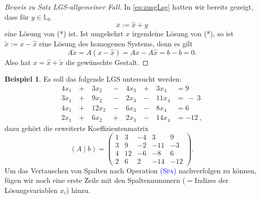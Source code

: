 \documentclass[a4paper,11pt,oneside]{article}
\theoremstyle{definition}
\newtheorem{example}{Beispiel}
\def\OP#1{\textcolor{blue}{(\textnormal{\textrm{\textsc{#1}})}}}
\begin{document}
\begin{proof}[Beweis zu Satz LGS-allgemeiner Fall]
In \eqref{eq:zusgLsg} hatten wir bereits gezeigt, dass für $y\in{\mathbb L}_0$
$$
\bar{x}:={\hat x}+y
$$
eine Lösung von (*) ist. Ist umgekehrt $x$ irgendeine Lösung von (*), so ist ${\tilde x}:=x-{\hat x}$ eine Lösung des homogenen Systems, denn es gilt
$$
A{\tilde x}=A(x-{\hat x})=Ax-A{\hat x}=b-b=0.
$$
Also hat $x ={\hat x}+{\tilde x}$ die gewünschte Gestalt.
\end{proof}


\begin{example}\label{Bsp:Kowalski}
Es soll das folgende LGS untersucht werden:
\begin{alignat*}{4}
x_1&\ +\ &3x_2&\ -\ &4x_3&\ +\ &3x_4&=9\\
3x_1&\ +\ &9x_2&\ -\ &2x_3&\ -\ &11x_4&=\ -\ 3\\
4x_1&\ +\ &12x_2&\ -\ &6x_3&\ -\ &8x_4&=6\\
2x_1&\ +\ &6x_2&\ +\ &2x_3&\ -\ &14x_4&=-12\ ,
\end{alignat*}
dazu gehört die erweiterte Koeffizientenmatrix
$$
(A\mid b)=\left(\begin{array}{cccc|c}
1&3&-4&3&9\\
3&9&-2&-11&-3\\
4&12&-6&-8&6\\
2&6&2&-14&-12
\end{array}\right).
$$
Um das Vertauschen von Spalten nach Operation \OP{Spa} nachverfolgen zu können, fügen wir noch eine erste Zeile mit den Spaltennummern ($=$Indizes
der Lösungsvariablen $x_i$) hinzu.


\end{example}
\end{document}
